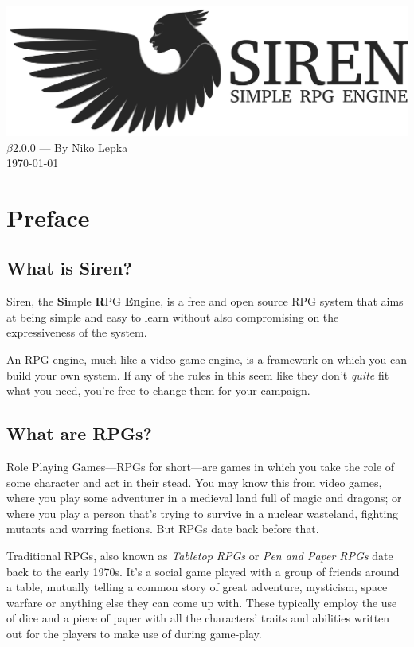 \documentclass[a4paper]{book}
\begin{document}
\begin{titlepage}
\begin{center}
  \includegraphics[width = \textwidth]{graphics/svg-logo.png}
  \LARGE{$\beta2.0.0$ --- By Niko Lepka}\\
  \Large{\today}
\end{center}
\end{titlepage}
\thispagestyle{empty} %
\frontmatter %
\chapter*{Preface}
\section*{What is Siren?}
Siren, the \textbf{Si}mple \textbf{R}PG \textbf{En}gine, is a free and open source RPG system that aims at being simple and easy to learn without also compromising on the expressiveness of the system.

An RPG engine, much like a video game engine, is a framework on which you can build your own system. If any of the rules in this seem like they don't \textit{quite} fit what you need, you're free to change them for your campaign.

\section*{What are RPGs?}
Role Playing Games---RPGs for short---are games in which you take the role of some character and act in their stead.
You may know this from video games, where you play some adventurer in a medieval land full of magic and dragons; or where you play a person that's trying to survive in a nuclear wasteland, fighting mutants and warring factions.
But RPGs date back before that.

Traditional RPGs, also known as \textit{Tabletop RPGs} or \textit{Pen and Paper RPGs} date back to the early 1970s.
It's a social game played with a group of friends around a table, mutually telling a common story of great adventure, mysticism, space warfare or anything else they can come up with.
These typically employ the use of dice and a piece of paper with all the characters' traits and abilities written out for the players to make use of during game-play.
\end{document}
